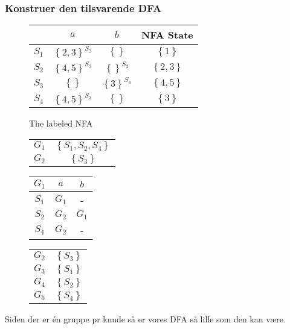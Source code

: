 \subsubsection{Konstruer den tilsvarende DFA}
\begin{figure}[!ht]\label{fig:2018:nfa2dfa}
  \centering
  \begin{tabular}{c|ccc}
          & $a$ & $b$ & NFA State\\\hline
    $S_1$ & $\left\{2,3\right\}^{S_2}$ & $\left\{\right\}$ & $\left\{1\right\}$ \\
    $S_2$ & $\left\{4,5\right\}^{S_3}$ & $\left\{\right\}^{S_2}$ & $\left\{2,3\right\}$ \\
    $S_3$ & $\left\{\right\}$ & $\left\{3\right\}^{S_4}$ & $\left\{4,5\right\}$ \\
    $S_4$ & $\left\{4,5\right\}^{S_3}$ & $\left\{\right\}$ & $\left\{3\right\}$ \\
  \end{tabular}
\end{figure}
\begin{figure}[!ht]\label{fig:2018:examfigdfa}
  \centering
  \caption{The labeled NFA}
\end{figure}
\begin{figure}[!ht]\label{fig:2018:g1}
  \centering
  \begin{tabular}{c|c}
    $G_1$ & $\left\{S_1,S_2,S_4\right\}$\\
    $G_2$ & $\left\{S_3\right\}$
  \end{tabular}
\end{figure}
\begin{figure}[!ht]\label{fig:2018:testg1}
  \centering
  \begin{tabular}{c|cc}
    $G_1$ & $a$ & $b$\\\hline
    $S_1$ & $G_1$ & - \\
    $S_2$ & $G_2$ & $G_1$ \\
    $S_4$ & $G_2$ & -
  \end{tabular}
\end{figure}
\begin{figure}[!ht]\label{fig:2018:g1}
  \centering
  \begin{tabular}{c|c}
    $G_2$ & $\left\{S_3\right\}$\\
    $G_3$ & $\left\{S_1\right\}$\\
    $G_4$ & $\left\{S_2\right\}$\\
    $G_5$ & $\left\{S_4\right\}$\\
  \end{tabular}
\end{figure}
Siden der er én gruppe pr knude så er vores DFA så lille som den kan være.
